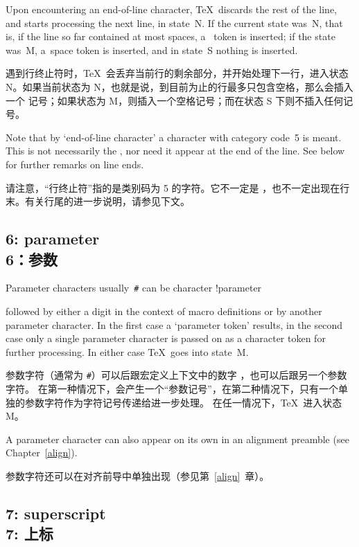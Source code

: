 Upon encountering an end-of-line character, 
\TeX\ discards the rest of the
line, and starts processing the next line,
in state~{\italic N}. If the current state was~{\italic N},
\awp
that is, if the
line so far contained at most spaces, a~ token
is inserted; if the state was~{\italic M}, a~space token is inserted,
and in state~{\italic S} nothing is inserted.

遇到行终止符时，\TeX\ 会丢弃当前行的剩余部分，并开始处理下一行，进入状态 {\italic N}。如果当前状态为 {\italic N}，也就是说，到目前为止的行最多只包含空格，那么会插入一个  记号；如果状态为 {\italic M}，则插入一个空格记号；而在状态 {\italic S} 下则不插入任何记号。

Note that by `end-of-line character' a character with category
code~5 is meant. This is not necessarily the ,
nor need it appear at the end of the line.
See below for further remarks on line ends.

请注意，“行终止符”指的是类别码为 5 的字符。它不一定是 ，也不一定出现在行末。有关行尾的进一步说明，请参见下文。

\subsection{6: parameter\\6：参数}

Parameter characters \ldash usually~\verb=#= \rdash  can be
\term character !parameter\par
followed by either a digit  
in the context of macro definitions
\altt
or by another parameter character. 
In the first case a `parameter token' results,
in the second case only a single parameter character
is passed on as a character token for further processing.
In either case \TeX\ goes into state~{\italic M}.

参数字符（通常为 \verb=#=）可以后跟宏定义上下文中的数字 ，也可以后跟另一个参数字符。
在第一种情况下，会产生一个“参数记号”，在第二种情况下，只有一个单独的参数字符作为字符记号传递给进一步处理。
在任一情况下，\TeX\ 进入状态 {\italic M}。

A parameter character can also appear on its own in an
alignment preamble (see Chapter~\ref{align}).

参数字符还可以在对齐前导中单独出现（参见第~\ref{align}~章）。


\subsection{7: superscript\\7: 上标}

